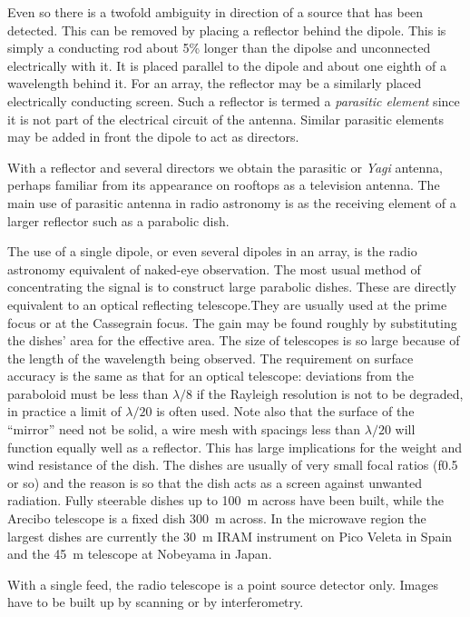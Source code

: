Even so there is a twofold ambiguity in direction of a source that has been detected. 
This can be removed by placing a reflector behind the dipole. This is simply a conducting rod 
about 5\% longer than the dipolse and unconnected electrically with it. It
is placed parallel to the dipole and about one eighth of a wavelength behind
it. For an array, the reflector may be a similarly placed electrically 
conducting screen. Such a reflector is termed a {\it parasitic element} since it is not part 
of the electrical circuit of the antenna. Similar parasitic elements may be added in front 
the dipole to act as directors.

With a reflector and several directors we obtain the parasitic or {\it Yagi} antenna, perhaps 
familiar from its appearance on rooftops as a television antenna. The main use of parasitic
antenna in radio astronomy is as the receiving element of a larger reflector such as a parabolic
dish.

The use of a single dipole, or even several dipoles in an array, is the
radio astronomy equivalent of naked-eye observation. The most usual method
of concentrating the signal is to construct large parabolic dishes. These
are directly equivalent to an optical reflecting telescope.They are
usually used at the prime focus or at the Cassegrain focus. The gain may 
be found roughly by substituting the dishes' area for the effective area. 
The size of telescopes is so large because of the length of the wavelength
being observed. The requirement on surface accuracy is the same as that for
an optical telescope: deviations from the paraboloid must be less than 
$\lambda/8$ if the Rayleigh resolution is not to be degraded, in practice a
limit of $\lambda/20$ is often used. Note also that the surface of the 
``mirror'' need not be solid, a wire mesh with spacings less than $\lambda/20$
will function equally well as a reflector. This has large implications for the
weight and wind resistance of the dish. The dishes are usually of very 
small focal ratios (f0.5 or so) and the reason is so that the dish acts
as a screen against unwanted radiation. Fully steerable dishes up to 100~m
across have been built, while the Arecibo telescope is a fixed dish 300~m 
across. In the microwave region the largest dishes are currently the 30~m IRAM
instrument on Pico Veleta in Spain and the 45~m telescope at Nobeyama in Japan.

With a single feed, the radio telescope is a point source detector only. 
Images have to be built up by scanning or by interferometry. 

